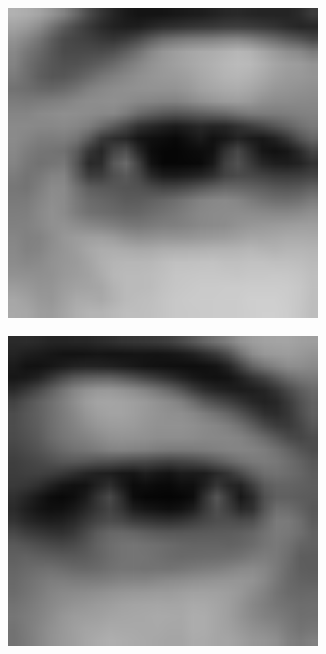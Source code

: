 \documentclass[a4paper, 12pt]{article}
\begin{document}
\begin{figure}[H]
	\centering
	\begin{subfigure}[b]{0.2\textwidth}
		\includegraphics[width=0.9\textwidth]{./processed/eye0.png}
	\end{subfigure}
	\begin{subfigure}[b]{0.2\textwidth}
		\includegraphics[width=0.9\textwidth]{./processed/eye1.png}

\end{subfigure}
\end{figure}
\end{document}
